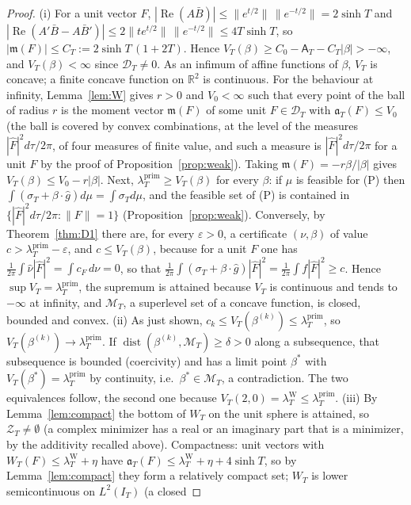 \documentclass[11pt]{amsart}
\theoremstyle{definition}
\theoremstyle{remark}
\newcommand{\R}{\mathbb R}
\newcommand{\Rel}{\operatorname{Re}}
\newcommand{\IT}{I_T}
\newcommand{\lamP}{\lambda^{\mathrm{prim}}_T}
\newcommand{\lamW}{\lambda^{\mathrm W}_T}
\newcommand{\sT}{\sigma_T}
\newcommand{\nuh}{\widehat\nu}
\newcommand{\Fh}{\widehat F}
\newcommand{\cF}{c_F}
\newcommand{\Aconst}{\mathsf A_T}
\begin{document}
\begin{proof}
(i) For a unit vector $F$, $|\Rel(A\bar B)|\le\|e^{t/2}\|\,\|e^{-t/2}\|=2\sinh T$ and
$|\Rel(A'\bar B-A\bar B')|\le2\|te^{t/2}\|\,\|e^{-t/2}\|\le4T\sinh T$, so $|\mathfrak m(F)|\le C_T:=2\sinh T\,(1+2T)$.
Hence $V_T(\beta)\ge C_0-\Aconst-C_T|\beta|>-\infty$, and $V_T(\beta)<\infty$ since $\mathcal D_T\ne0$. As an infimum
of affine functions of $\beta$, $V_T$ is concave; a finite concave function on $\R^2$ is continuous. For the
behaviour at infinity, Lemma~\ref{lem:W} gives $r>0$ and $V_0<\infty$ such that every point of the ball of radius
$r$ is the moment vector $\mathfrak m(F)$ of some unit $F\in\mathcal D_T$ with $\mathfrak a_T(F)\le V_0$ (the ball is covered by
convex combinations, at the level of the measures $|\Fh|^2d\tau/2\pi$, of four measures of finite value, and such a
measure is $|\Fh|^2d\tau/2\pi$ for a unit $F$ by the proof of Proposition~\ref{prop:weak}). Taking
$\mathfrak m(F)=-r\beta/|\beta|$ gives $V_T(\beta)\le V_0-r|\beta|$.
Next, $\lamP\ge V_T(\beta)$ for every $\beta$: if $\mu$ is feasible for (P) then $\int(\sT+\beta\cdot\widehat g)d\mu=\int\sT d\mu$,
and the feasible set of (P) is contained in $\{|\Fh|^2d\tau/2\pi:\|F\|=1\}$ (Proposition~\ref{prop:weak}). Conversely,
by Theorem~\ref{thm:D1} there are, for every $\varepsilon>0$, a certificate $(\nu,\beta)$ of value $c>\lamP-\varepsilon$,
and $c\le V_T(\beta)$, because for a unit $F$ one has $\frac1{2\pi}\int\nuh|\Fh|^2=\int\cF\,d\nu=0$, so that
$\frac1{2\pi}\int(\sT+\beta\cdot\widehat g)|\Fh|^2=\frac1{2\pi}\int f|\Fh|^2\ge c$. Hence $\sup V_T=\lamP$, the
supremum is attained because $V_T$ is continuous and tends to $-\infty$ at infinity, and $\mathcal M_T$, a superlevel
set of a concave function, is closed, bounded and convex.
(ii) As just shown, $c_k\le V_T(\beta^{(k)})\le\lamP$, so $V_T(\beta^{(k)})\to\lamP$. If $\operatorname{dist}(\beta^{(k)},\mathcal M_T)\ge\delta>0$
along a subsequence, that subsequence is bounded (coercivity) and has a limit point $\beta^*$ with
$V_T(\beta^*)=\lamP$ by continuity, i.e.\ $\beta^*\in\mathcal M_T$, a contradiction. The two equivalences follow, the
second one because $V_T(2,0)=\lamW\le\lamP$.
(iii) By Lemma~\ref{lem:compact} the bottom of $W_T$ on the unit sphere is attained, so $\mathcal Z_T\ne\emptyset$
(a complex minimizer has a real or an imaginary part that is a minimizer, by the additivity recalled above).
Compactness: unit vectors with $W_T(F)\le\lamW+\eta$ have $\mathfrak a_T(F)\le\lamW+\eta+4\sinh T$, so by
Lemma~\ref{lem:compact} they form a relatively compact set; $W_T$ is lower semicontinuous on $L^2(\IT)$ (a closed

\end{proof}
\end{document}
